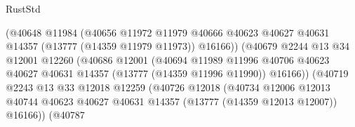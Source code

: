 \begin{lexlean}{RustStd}
\begin{coremodule}
                                        (@40648
                                          @11984
                                          (@40656
                                            @11972
                                            @11979
                                            @40666
                                            @40623
                                            @40627
                                            @40631
                                            @14357
                                            (@13777 (@14359 @11979 @11973))
                                            @16166))
                                        (@40679
                                          @2244
                                          @13
                                          @34
                                          @12001
                                          @12260
                                          (@40686
                                            @12001
                                            (@40694
                                              @11989
                                              @11996
                                              @40706
                                              @40623
                                              @40627
                                              @40631
                                              @14357
                                              (@13777 (@14359 @11996 @11990))
                                              @16166))
                                          (@40719
                                            @2243
                                            @13
                                            @33
                                            @12018
                                            @12259
                                            (@40726
                                              @12018
                                              (@40734
                                                @12006
                                                @12013
                                                @40744
                                                @40623
                                                @40627
                                                @40631
                                                @14357
                                                (@13777 (@14359 @12013 @12007))
                                                @16166))
                                            (@40787

\end{coremodule}
\end{lexlean}
